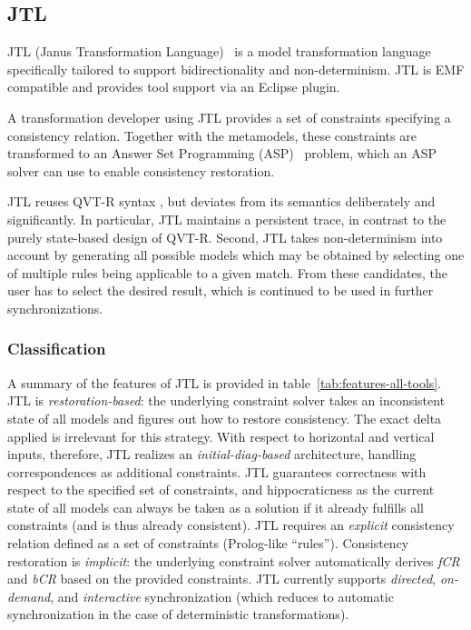 \subsection{JTL}
\label{sec:JTL}

JTL (Janus Transformation Language)~\cite{CDEP10,ErPT18} is a model transformation language specifically tailored to support bidirectionality and non-determinism.
JTL is EMF compatible and provides tool support via an Eclipse plugin.

A transformation developer using JTL provides a set of constraints specifying a consistency relation.
Together with the metamodels, these constraints are transformed to an Answer Set Programming (ASP)~\cite{GL88} problem, which an ASP solver can use to enable consistency restoration.

JTL reuses QVT-R syntax \cite{QVT-1.3}, but deviates from its semantics deliberately and significantly. In particular, JTL maintains a persistent trace, in contrast to the purely state-based design of QVT-R. Second, JTL takes non-determinism into account by generating all possible models which may be obtained by selecting one of multiple rules being applicable to a given match. From these candidates, the user has to select the desired result, which is continued to be used in further synchronizations.


\subsubsection{Classification}
A summary of the features of JTL is provided in table~\ref{tab:features-all-tools}.
JTL is \emph{restoration-based}: the underlying constraint solver takes an inconsistent state of all models and figures out how to restore consistency.
The exact delta applied is irrelevant for this strategy.
%
With respect to horizontal and vertical inputs, therefore, JTL realizes an \emph{initial-diag-based} architecture, handling correspondences as additional constraints. 
%
JTL guarantees correctness with respect to the specified set of constraints, and hippocraticness as the current state of all models can always be taken as a solution if it already fulfills all constraints (and is thus already consistent).
%
JTL requires an \emph{explicit} consistency relation defined as a set of constraints (Prolog-like ``rules'').
%
Consistency restoration is \emph{implicit}:  the underlying constraint solver automatically derives \emph{fCR} and \emph{bCR} based on the provided constraints.
%
JTL currently supports \emph{directed}, \emph{on-demand}, and \emph{interactive} synchronization (which reduces to automatic synchronization in the case of deterministic transformations).

